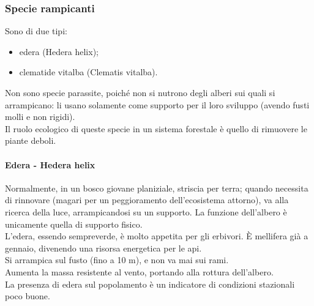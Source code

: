 \subsubsection{Specie rampicanti}
Sono di due tipi:
\begin{itemize}[nosep]
    \item edera (Hedera helix);
    \item clematide vitalba (Clematis vitalba).
\end{itemize}
Non sono specie parassite, poiché non si nutrono degli alberi sui quali si arrampicano: li usano solamente come supporto per il loro sviluppo (avendo fusti molli e non rigidi).\\
Il ruolo ecologico di queste specie in un sistema forestale è quello di rimuovere le piante deboli.
\paragraph{Edera - Hedera helix}
Normalmente, in un bosco giovane planiziale, striscia per terra; quando necessita di rinnovare (magari per un peggioramento dell'ecosistema attorno), va alla ricerca della luce, arrampicandosi su un supporto. La funzione dell'albero è unicamente quella di supporto fisico.\\
L'edera, essendo sempreverde, è molto appetita per gli erbivori. È mellifera già a gennaio, divenendo una risorsa energetica per le api.\\
Si arrampica sul fusto (fino a 10 m), e non va mai sui rami.\\
Aumenta la massa resistente al vento, portando alla rottura dell'albero.\\
La presenza di edera sul popolamento è un indicatore di condizioni stazionali poco buone.
